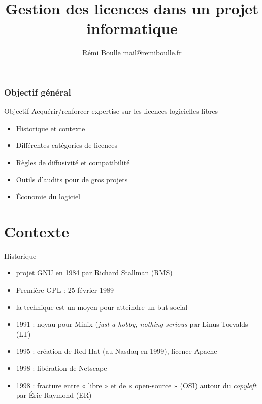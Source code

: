 \documentclass{beamer}
\title[]{Gestion des licences dans un projet informatique}
\author{Rémi Boulle  \href{mailto:mail@remiboulle.fr}{mail@remiboulle.fr}}
\date{}
\institute{}
\begin{document}


\begin{frame}
  \titlepage
\end{frame}



\begin{frame}
\frametitle{Objectif g\'en\'eral}
\begin{alertblock}{Objectif}
  Acquérir/renforcer expertise sur les licences logicielles libres
\end{alertblock}


  \begin{itemize}
  \item Historique et contexte
  \item Différentes catégories de licences
  \item Règles de diffusivité et compatibilité
  \item Outils d'audits pour de gros projets
  \item Économie du logiciel
  \end{itemize}
\end{frame}


\section{Contexte}


\begin{frame}{Historique}
  \begin{itemize}
  \item projet GNU en 1984 par Richard Stallman (RMS)
  \item Première GPL : 25 février 1989
  \item la technique est un moyen pour atteindre un but social
  \item 1991 : noyau pour Minix (\textit{just a hobby, nothing serious} par Linus Torvalds (LT)
  \item 1995 : création de Red Hat (au Nasdaq en 1999), licence Apache
  \item 1998 : libération de Netscape
  \item 1998 : fracture entre « libre » et de « open-source » (OSI) autour du \textit{copyleft} par Éric Raymond (ER)
  \end{itemize}
\end{frame}
\end{document}
